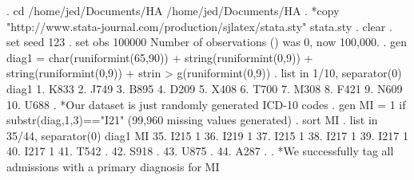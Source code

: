 . cd /home/jed/Documents/HA
/home/jed/Documents/HA
{\smallskip}
. *copy "http://www.stata-journal.com/production/sjlatex/stata.sty" stata.sty
. clear
{\smallskip}
. set seed 123
{\smallskip}
. set obs 100000
Number of observations ({}) was 0, now 100,000.
{\smallskip}
. gen diag1 = char(runiformint(65,90)) + string(runiformint(0,9)) + string(runiformint(0,9)) + strin
> g(runiformint(0,9))
{\smallskip}
. list in 1/10, separator(0)
{\smallskip}
     {\TLC}
     {\VBAR} diag1 {\VBAR}
     {\LFTT}
  1. {\VBAR}  K833 {\VBAR}
  2. {\VBAR}  J749 {\VBAR}
  3. {\VBAR}  B895 {\VBAR}
  4. {\VBAR}  D209 {\VBAR}
  5. {\VBAR}  X408 {\VBAR}
  6. {\VBAR}  T700 {\VBAR}
  7. {\VBAR}  M308 {\VBAR}
  8. {\VBAR}  F421 {\VBAR}
  9. {\VBAR}  N609 {\VBAR}
 10. {\VBAR}  U688 {\VBAR}
     {\BLC}
{\smallskip}
. *Our dataset is just randomly generated ICD-10 codes
. gen MI = 1 if substr(diag,1,3)=="I21"
(99,960 missing values generated)
{\smallskip}
. sort MI
{\smallskip}
. list in 35/44, separator(0)
{\smallskip}
     {\TLC}
     {\VBAR} diag1   MI {\VBAR}
     {\LFTT}
 35. {\VBAR}  I215    1 {\VBAR}
 36. {\VBAR}  I219    1 {\VBAR}
 37. {\VBAR}  I215    1 {\VBAR}
 38. {\VBAR}  I217    1 {\VBAR}
 39. {\VBAR}  I217    1 {\VBAR}
 40. {\VBAR}  I217    1 {\VBAR}
 41. {\VBAR}  T542    . {\VBAR}
 42. {\VBAR}  S918    . {\VBAR}
 43. {\VBAR}  U875    . {\VBAR}
 44. {\VBAR}  A287    . {\VBAR}
     {\BLC}
{\smallskip}
. *We successfully tag all admissions with a primary diagnosis for MI
